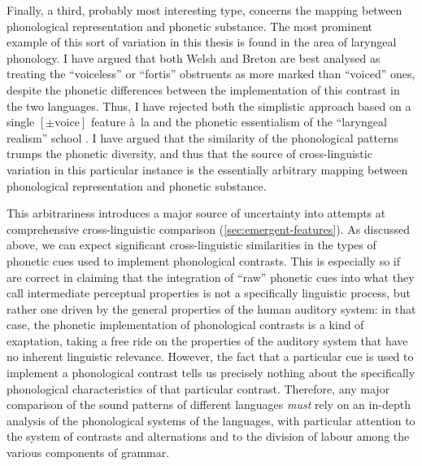 Finally, a third, probably most interesting type, concerns the mapping between phonological representation and phonetic substance. The most prominent example of this sort of variation in this thesis is found in the area of laryngeal phonology. I have argued that both Welsh and Breton are best analysed as treating the \enquote{voiceless} or \enquote{fortis} obstruents as more marked than \enquote{voiced} ones, despite the phonetic differences between the implementation of this contrast in the two languages. Thus, I have rejected both the simplistic approach based on a single $[\pm\mbox{voice}]$ feature à~la \citet{wetzels01:_typol_voicin_devoic} and the phonetic essentialism of the \enquote{laryngeal realism} school \citep{iverson95,iverson99:_laryn_german,iverson03:_laryn_german,jessen02:_laryn_german,helgason08:_voicin_swedis,honeybone05}. I have argued that the similarity of the phonological patterns trumps the phonetic diversity, and thus that the source of cross\hyp linguistic variation in this particular instance is the essentially arbitrary mapping between phonological representation and phonetic substance.

This arbitrariness introduces a major source of uncertainty into attempts at comprehensive cross\hyp linguistic comparison (\cref{sec:emergent-features}). As discussed above, we can expect significant cross\hyp linguistic similarities in the types of phonetic cues used to implement phonological contrasts. This is especially so if \citet{kingston08} are correct in claiming that the integration of \enquote{raw} phonetic cues into what they call intermediate perceptual properties is not a specifically linguistic process, but rather one driven by the general properties of the human auditory system: in that case, the phonetic implementation of phonological contrasts is a kind of exaptation, taking a free ride on the properties of the auditory system that have no inherent linguistic relevance. However, the fact that a particular cue is used to implement a phonological contrast tells us precisely nothing about the specifically phonological characteristics of that particular contrast. Therefore, any major comparison of the sound patterns of different languages \emph{must} rely on an in\hyp depth analysis of the phonological systems of the languages, with particular attention to the system of contrasts and alternations and to the division of labour among the various components of grammar.

